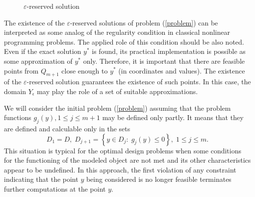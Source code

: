 \documentclass[review]{elsarticle}
\begin{document}
\begin{figure}[h]
	\caption{$\varepsilon$-reserved solution}
	\label{fig:eps_reserved_solution}
\end{figure}

	The existence of the $\varepsilon$-reserved solutions of problem (\ref{problem}) can be interpreted as some analog of the regularity condition in classical nonlinear programming problems. The applied role of this condition should be also noted. Even if the exact solution $y^\ast$ is found, its practical implementation is possible as some approximation of $y^\ast$ only. Therefore, it is important that there are feasible points from $Q_{m+1}$ close enough to $y^\ast$ (in coordinates and values). The existence of the $\varepsilon$-reserved solution guarantees the existence of such points. In this case, the domain $Y_{\epsilon}$ may play the role of a set of suitable approximations.

	We will consider the initial problem (\ref{problem}) assuming that the problem functions $g_{j}(y), 1 \leq j \leq m+1$ may be defined only partly. It means that they are defined and calculable only in the sets 
\begin{equation}\label{D_sets}
	D_1 = D, \; D_{j+1} = \left\{ y \in D_j: \; g_j(y) \leq 0 \right\}, \; 1 \leq j \leq m.
\end{equation}
This situation is typical for the optimal design problems when some conditions for the functioning of the modeled object are not met and its other characteristics appear to be undefined. In this approach, the first violation of any constraint indicating that the point $y$ being considered is no longer feasible terminates further computations at the point $y$.
\end{document}
